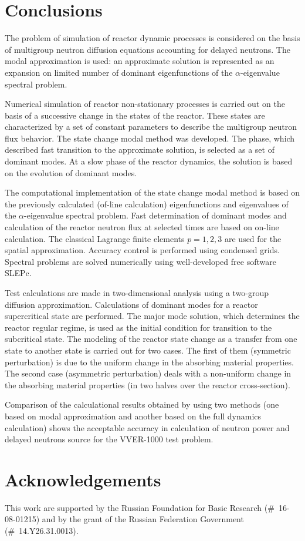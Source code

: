 \documentclass[authoryear]{elsarticle}
\begin{document}
\section{Conclusions} 

The problem of simulation of reactor dynamic processes is considered on the basis of multigroup neutron diffusion equations accounting for delayed neutrons.
The modal approximation is used: an approximate solution is represented as an expansion on limited number of dominant eigenfunctions of the $\alpha$-eigenvalue spectral problem.

Numerical simulation of reactor non-stationary processes is carried out on the basis of a successive change in the states of the reactor. These states are characterized by a set of constant parameters to describe the multigroup neutron flux behavior.
The state change modal method was developed. The phase, which described fast transition to the approximate solution, is selected as a set of dominant modes. At a slow phase of the reactor dynamics, the solution is based on the evolution of dominant modes.

The computational implementation of the state change modal method is based on the previously calculated (of-line calculation) eigenfunctions and eigenvalues of the  $\alpha$-eigenvalue spectral problem. Fast determination of dominant modes and calculation of the reactor neutron flux at selected times are based on on-line calculation.
The classical Lagrange finite elements $p=1,2,3$ are used for the spatial approximation. 
Accuracy control is performed using condensed grids. Spectral problems are solved numerically using well-developed free software SLEPc.

Test calculations are made in two-dimensional analysis using a two-group diffusion approximation. Calculations of dominant modes for a reactor supercritical state are performed. The major mode solution, which determines the reactor regular regime, is used as the initial condition for transition to the subcritical state. The modeling of the reactor state change as a transfer from one state to another state is carried out for two cases. The first of them (symmetric perturbation) is due to the uniform change in the absorbing material properties. The second case (asymmetric perturbation) deals with a non-uniform change in the absorbing material properties (in two halves over the reactor cross-section).

Comparison of the calculational results obtained by using two methods (one based on modal approximation and another based on the full dynamics calculation) shows the acceptable accuracy in calculation of neutron power and delayed neutrons source for the VVER-1000 test problem.

\section*{Acknowledgements}

This work are supported by the Russian Foundation for Basic Research (\#~16-08-01215) 
and by the grant of the Russian Federation Government 
(\#~14.Y26.31.0013).

\clearpage


\end{document}
